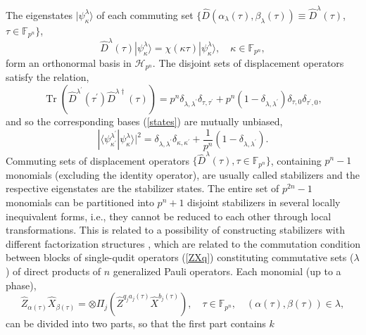 \documentclass{article}
\DeclareMathOperator{\Tr}{Tr}
\begin{document}
The eigenstates $|\psi_\kappa^\lambda\rangle$ of each commuting set
$\{\hat{D}\left(\alpha_{\lambda}(\tau),\beta_{\lambda}(\tau)\right) \equiv
\hat{D}^{\lambda}(\tau)$, $\tau \in \mathbb{F}_{p^{n}}\}$,
\begin{equation}
  \hat{D}^{\lambda}(\tau) |\psi_{\kappa}^{\lambda}\rangle
  = \chi(\kappa \tau) |\psi_{\kappa}^{\lambda }\rangle,
  \quad \kappa \in \mathbb{F}_{p^{n}},
  \label{states}
\end{equation}
form an orthonormal basis in $\mathcal{H}_{p^{n}}$. The disjoint sets of
displacement operators satisfy the relation,%
\begin{equation*}
  \Tr\left(
    \hat{D}^{\lambda^{\prime}}(\tau^{\prime})\hat{D}^{\lambda\dagger}(\tau)
  \right)
  = p^{n}\delta_{\lambda,\lambda^{\prime}}\delta_{\tau,\tau^{\prime }} +
  p^{n}(1 - \delta_{\lambda,\lambda^{\prime}}) \delta_{\tau,0}
  \delta_{\tau^{\prime},0},
\end{equation*}
and so the corresponding bases (\ref{states}) are mutually unbiased,
\begin{equation}
  |\langle\psi_{\kappa^{\prime}}^{\lambda^{\prime}}
  |\psi_{\kappa}^{\lambda}\rangle|^{2}
  = \delta_{\lambda,\lambda^{\prime}} \delta_{\kappa,\kappa^{\prime}} +
  \frac{1}{p^{n}} (1-\delta_{\lambda,\lambda^{\prime}}).
  \label{UB}
\end{equation}
Commuting sets of displacement operators $\{\hat{D}^{\lambda }(\tau ),\tau
\in \mathbb{F}_{p^{n}}\}$, containing $p^{n}-1$ monomials (excluding the
identity operator), are usually called stabilizers and the respective
eigenstates are the stabilizer states. The entire set of $p^{2n}-1$
monomials can be partitioned into $p^{n}+1$ disjoint stabilizers in several
locally inequivalent forms, i.e., they cannot be reduced to each other
through local transformations. This is related to a possibility of
constructing stabilizers with different factorization structures
\cite{factor1,factor2}, which are related to the commutation condition between
blocks of single-qudit operators (\ref{ZXq}) constituting commutative sets ($%
\lambda $) of direct products of $n$ generalized Pauli operators. Each
monomial (up to a phase), 
\begin{equation*}
  \hat{Z}_{\alpha(\tau)}\hat{X}_{\beta(\tau)}
  = \otimes \Pi_{j}\left(
    \hat{Z}^{q_{j}a_{j}(\tau)}\hat{X}^{b_{j}(\tau)}
  \right),
  \quad \tau \in \mathbb{F}_{p^{n}},
  \quad \left(\alpha(\tau),\beta(\tau)\right)
  \in \lambda,
\end{equation*}
can be divided into two parts, so that the first part contains $k$
\end{document}
